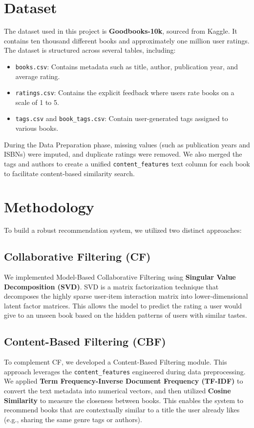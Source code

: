 \documentclass[12pt]{article}
\begin{document}
\section{Dataset}
The dataset used in this project is \textbf{Goodbooks-10k}, sourced from Kaggle. It contains ten thousand different books and approximately one million user ratings. The dataset is structured across several tables, including:
\begin{itemize}
    \item \texttt{books.csv}: Contains metadata such as title, author, publication year, and average rating.
    \item \texttt{ratings.csv}: Contains the explicit feedback where users rate books on a scale of 1 to 5.
    \item \texttt{tags.csv} and \texttt{book\_tags.csv}: Contain user-generated tags assigned to various books.
\end{itemize}
During the Data Preparation phase, missing values (such as publication years and ISBNs) were imputed, and duplicate ratings were removed. We also merged the tags and authors to create a unified \texttt{content\_features} text column for each book to facilitate content-based similarity search.

\section{Methodology}
To build a robust recommendation system, we utilized two distinct approaches:
\subsection{Collaborative Filtering (CF)}
We implemented Model-Based Collaborative Filtering using \textbf{Singular Value Decomposition (SVD)}. SVD is a matrix factorization technique that decomposes the highly sparse user-item interaction matrix into lower-dimensional latent factor matrices. This allows the model to predict the rating a user would give to an unseen book based on the hidden patterns of users with similar tastes. 
\subsection{Content-Based Filtering (CBF)}
To complement CF, we developed a Content-Based Filtering module. This approach leverages the \texttt{content\_features} engineered during data preprocessing. We applied \textbf{Term Frequency-Inverse Document Frequency (TF-IDF)} to convert the text metadata into numerical vectors, and then utilized \textbf{Cosine Similarity} to measure the closeness between books. This enables the system to recommend books that are contextually similar to a title the user already likes (e.g., sharing the same genre tags or authors).
\end{document}
